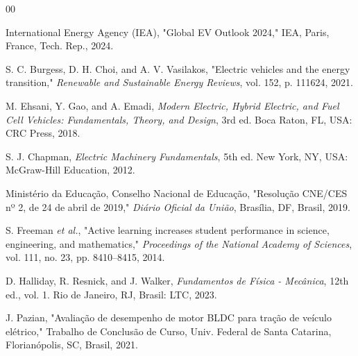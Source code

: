 \documentclass[conference]{IEEEtran}
\begin{document}
\begin{thebibliography}{00}

 International Energy Agency (IEA), "Global EV Outlook 2024," IEA, Paris, France, Tech. Rep., 2024.

 S. C. Burgess, D. H. Choi, and A. V. Vasilakos, "Electric vehicles and the energy transition," \textit{Renewable and Sustainable Energy Reviews}, vol. 152, p. 111624, 2021.

 M. Ehsani, Y. Gao, and A. Emadi, \textit{Modern Electric, Hybrid Electric, and Fuel Cell Vehicles: Fundamentals, Theory, and Design}, 3rd ed. Boca Raton, FL, USA: CRC Press, 2018.

 S. J. Chapman, \textit{Electric Machinery Fundamentals}, 5th ed. New York, NY, USA: McGraw-Hill Education, 2012.

 Ministério da Educação, Conselho Nacional de Educação, "Resolução CNE/CES nº 2, de 24 de abril de 2019," \textit{Diário Oficial da União}, Brasília, DF, Brasil, 2019.

 S. Freeman \textit{et al.}, "Active learning increases student performance in science, engineering, and mathematics," \textit{Proceedings of the National Academy of Sciences}, vol. 111, no. 23, pp. 8410--8415, 2014.

D. Halliday, R. Resnick, and J. Walker, \textit{Fundamentos de Física - Mecânica}, 12th ed., vol. 1. Rio de Janeiro, RJ, Brasil: LTC, 2023.

J. Pazian, "Avaliação de desempenho de motor BLDC para tração de veículo elétrico," Trabalho de Conclusão de Curso, Univ. Federal de Santa Catarina, Florianópolis, SC, Brasil, 2021.

\end{thebibliography}
\end{document}
